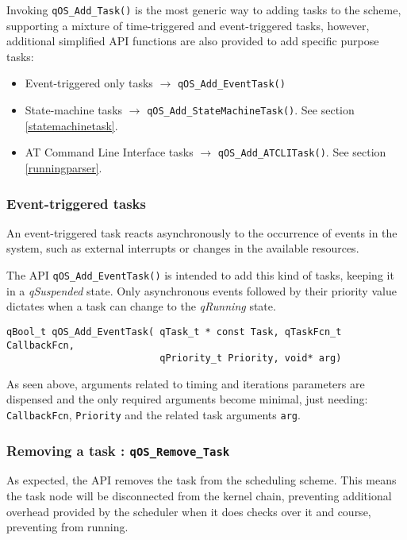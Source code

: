 \noindent\hrulefill

Invoking \lstinline{qOS_Add_Task()}  is the most generic way to adding tasks to the scheme, supporting a mixture of time-triggered and event-triggered tasks, however, additional simplified API functions are also provided to add specific purpose tasks:
\begin{itemize}
    \item Event-triggered only tasks $\rightarrow$ \lstinline{qOS_Add_EventTask()}
    \item State-machine tasks $\rightarrow$ \lstinline{qOS_Add_StateMachineTask()}. See section \ref{statemachinetask}.
    \item AT Command Line Interface tasks $\rightarrow$ \lstinline{qOS_Add_ATCLITask()}. See section \ref{runningparser}.
\end{itemize}


\subsubsection{Event-triggered tasks}
An event-triggered task reacts asynchronously to the occurrence of events in the system, such as external interrupts or changes in the available resources. 

The API \lstinline{qOS_Add_EventTask()}  is intended to add this kind of tasks, keeping it in a \textit{qSuspended} state. Only asynchronous events followed by their priority value dictates when a task can change to the \textit{qRunning} state. \\


\begin{lstlisting}[style=CStyle]
qBool_t qOS_Add_EventTask( qTask_t * const Task, qTaskFcn_t CallbackFcn, 
                           qPriority_t Priority, void* arg)
\end{lstlisting}

As seen above, arguments related to timing and iterations parameters are dispensed and the only required arguments become minimal, just needing:  \lstinline{CallbackFcn}, \lstinline{Priority} and the related task arguments \lstinline{arg}.

\subsubsection{Removing a task : \lstinline{qOS_Remove_Task}}
As expected, the API removes the task from the scheduling scheme.  This means the task node will be disconnected from the kernel chain, preventing additional overhead provided by the scheduler when it does checks over it and course, preventing from running. \\

